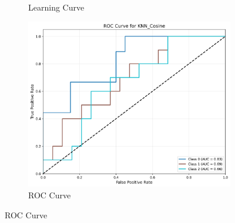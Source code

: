 \documentclass[10pt]{article}
\begin{document}
\begin{figure}[!ht]
\begin{subfigure}{0.33\textwidth}
            \caption{Learning Curve}
        \end{subfigure}
        \begin{subfigure}{0.33\textwidth}
            \centering
            \includegraphics[width=\textwidth]{code/ResultsMainAugZip/plots/Block3_Probabilistic_Experiment_II/roc_curve_KNN_Cosine.png}
            \caption{ROC Curve}
        \end{subfigure}
    \end{figure}
    
\end{document}
